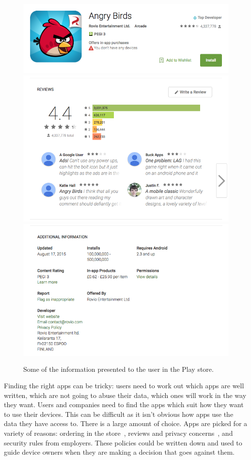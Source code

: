 \documentclass[a4paper]{scrartcl}
\begin{document}
\begin{figure}\centering
  \includegraphics[width=0.8\linewidth]{images/angrybirds.png}
  \includegraphics[width=0.8\linewidth]{images/reviews.png}
  \includegraphics[width=0.8\linewidth]{images/additionalinfo.png}
  \caption{Some of the information presented to the user in the Play store.}
  \label{fig:storeinfo}
\end{figure}

Finding the right apps can be tricky:
  users need to work out which apps are well written, which are not going to abuse their data, which ones will work in the way they want.
Users and companies need to find the apps which suit how they want to use their devices.
This can be difficult as it isn't obvious how apps use the data they have access to.
There is a large amount of choice.
Apps are picked for a variety of reasons:
  ordering in the store~\citep{Prata:2012in},
  reviews and privacy concerns~\citep{Kelley:2013kc},
  and security rules from employers.
These policies could be written down and used to guide device owners when they are making a decision that goes against them.
\end{document}
